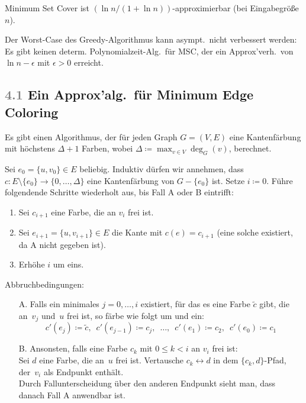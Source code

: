 \documentclass{cheat-sheet}
\newcommand{\Youtube}[1]{\href{https://www.youtube.com/watch?v=#1}{\textcolor{YoutubeColor}{$\blacktriangleright$}}}
\newcommand{\Algorithm}[1]{\textcolor{AlgorithmColor}{\textbf{#1}}}
\newcommand{\Problem}[1]{\textcolor{ProblemColor}{\textbf{#1}}}
\newcommand{\scriptSection}[1]{\textcolor{gray}{#1}\enspace}
\begin{document}
\begin{kor}
  Minimum Set Cover ist $(\ln n / (1 + \ln n))$-approximierbar (bei Eingabegröße~$n$).
\end{kor}

\begin{resultat}
  Der Worst-Case des Greedy-Algorithmus kann asympt.\ nicht verbessert werden:
  Es gibt keinen determ. Polynomialzeit-Alg.\ für MSC, der ein Approx'verh.\ von $\ln n - \epsilon$ mit $\epsilon > 0$ erreicht.
\end{resultat}


\subsection{\scriptSection{4.1} Ein Approx'alg.\ für \Problem{Minimum Edge Coloring}}

\begin{satz}[\Algorithm{Vizings Algorithmus}, \Youtube{otky1bBhwgM}]
  Es gibt einen Algorithmus, der für jeden Graph $G = (V, E)$ eine Kantenfärbung mit höchstens $\Delta + 1$ Farben, wobei $\Delta \coloneqq {\max}_{v \in V} \deg_G(v)$, berechnet.
\end{satz}

\begin{alg}
  Sei $e_0 = \{ u, v_0 \} \in E$ beliebig.
  Induktiv dürfen wir annehmen, dass $c : E \setminus \{ e_0 \} \to \{ 0, \ldots, \Delta \}$ eine Kantenfärbung von $G - \{ e_0 \}$ ist.
  Setze $i \coloneqq 0$.
  Führe folgendende Schritte wiederholt aus, bis Fall A oder B eintrifft:

  \begin{enumerate}
    \item Sei $c_{i+1}$ eine Farbe, die an $v_i$ frei ist.
    \item Sei $e_{i+1} = \{ u, v_{i+1} \} \in E$ die Kante mit $c(e) = c_{i+1}$ (eine solche existiert, da A nicht gegeben ist).
    \item Erhöhe $i$ um eins.
  \end{enumerate}

  Abbruchbedingungen:
  \begin{enumerate}
    \item[A.] Falls ein minimales $j = 0, \ldots, i$ existiert, für das es eine Farbe $\tilde{c}$ gibt, die an~$v_j$ und~$u$ frei ist, so färbe wie folgt um und ein:
    \[
      c'(e_j) \coloneqq \tilde{c}, \enspace
      c'(e_{j-1}) \coloneqq c_j, \enspace
      \ldots, \enspace
      c'(e_1) \coloneqq c_2, \enspace
      c'(e_0) \coloneqq c_1
   \]
    \item[B.]
      Ansonsten, falls eine Farbe $c_k$ mit $0 \leq k < i$ an $v_i$ frei ist: \\
      Sei $d$ eine Farbe, die an~$u$ frei ist.
      Vertausche $c_k \leftrightarrow d$ in dem $\{ c_k, d \}$-Pfad, der~$v_i$ als Endpunkt enthält. \\
      Durch Fallunterscheidung über den anderen Endpunkt sieht man, dass danach Fall A anwendbar ist.
  \end{enumerate}
\end{alg}
\end{document}
